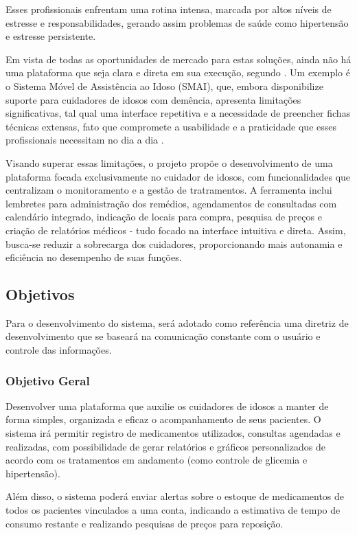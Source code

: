 \documentclass[
	article,			%
	12pt,				%
	oneside,			%
	a4paper,			%
    BIBLATEX,           %
	english,			%
	brazil,				%
	sumario=tradicional
	]{abntex2}
\begin{document}
Esses profissionais enfrentam uma rotina intensa, marcada por altos níveis de estresse e responsabilidades, gerando assim problemas de saúde como hipertensão e estresse persistente.

Em vista de todas as oportunidades de mercado para estas soluções, ainda não há uma plataforma que seja clara e direta em sua execução, segundo . Um exemplo é o Sistema Móvel de Assistência ao Idoso (SMAI), que, embora disponibilize suporte para cuidadores de idosos com demência, apresenta limitações significativas, tal qual uma interface repetitiva e a necessidade de preencher fichas técnicas extensas, fato que compromete a usabilidade e a praticidade que esses profissionais necessitam no dia a dia \cite{andre2020}.

Visando superar essas limitações, o projeto propõe o desenvolvimento de uma plataforma focada exclusivamente no cuidador de idosos, com funcionalidades que centralizam o monitoramento e a gestão de tratramentos. A ferramenta inclui lembretes para administração dos remédios, agendamentos de consultadas com calendário integrado, indicação de locais para compra, pesquisa de preços e criação de relatórios médicos - tudo focado na interface intuitiva e direta. Assim, busca-se reduzir a sobrecarga dos cuidadores, proporcionando mais autonamia e eficiência no desempenho de suas funções.
\subsection{Objetivos}

Para o desenvolvimento do sistema, será adotado como referência uma diretriz de desenvolvimento que se baseará na comunicação constante com o usuário e controle das informações.

\subsubsection{Objetivo Geral}

Desenvolver uma plataforma que auxilie os cuidadores de idosos a manter de forma simples, organizada e eficaz o acompanhamento de seus pacientes. O sistema irá permitir registro de medicamentos utilizados, consultas agendadas e realizadas, com possibilidade de gerar relatórios e gráficos personalizados de acordo com os tratamentos em andamento (como controle de glicemia e hipertensão).

Além disso, o sistema poderá enviar alertas sobre o estoque de medicamentos de todos os pacientes vinculados a uma conta, indicando a estimativa de tempo de consumo restante e realizando pesquisas de preços para reposição. 
\end{document}
